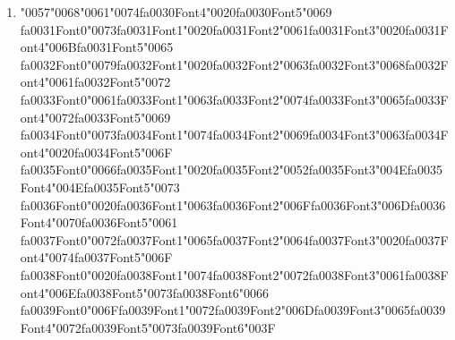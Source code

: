 \documentclass[12pt]{article}
\begin{document}
\begin{enumerate}[label=Q\arabic*.]
\begin{enumerate}[label=(\Alph*)]
    \item Ignore context entirely
    \item Only use previous tokens
\end{enumerate}
\item {\char"0057}{\char"0068}{\char"0061}{\char"0074}{\csname fa0030Font4\endcsname\char"0020}{\csname fa0030Font5\endcsname\char"0069} {\csname fa0031Font0\endcsname\char"0073}{\csname fa0031Font1\endcsname\char"0020}{\csname fa0031Font2\endcsname\char"0061}{\csname fa0031Font3\endcsname\char"0020}{\csname fa0031Font4\endcsname\char"006B}{\csname fa0031Font5\endcsname\char"0065} {\csname fa0032Font0\endcsname\char"0079}{\csname fa0032Font1\endcsname\char"0020}{\csname fa0032Font2\endcsname\char"0063}{\csname fa0032Font3\endcsname\char"0068}{\csname fa0032Font4\endcsname\char"0061}{\csname fa0032Font5\endcsname\char"0072} {\csname fa0033Font0\endcsname\char"0061}{\csname fa0033Font1\endcsname\char"0063}{\csname fa0033Font2\endcsname\char"0074}{\csname fa0033Font3\endcsname\char"0065}{\csname fa0033Font4\endcsname\char"0072}{\csname fa0033Font5\endcsname\char"0069} {\csname fa0034Font0\endcsname\char"0073}{\csname fa0034Font1\endcsname\char"0074}{\csname fa0034Font2\endcsname\char"0069}{\csname fa0034Font3\endcsname\char"0063}{\csname fa0034Font4\endcsname\char"0020}{\csname fa0034Font5\endcsname\char"006F} {\csname fa0035Font0\endcsname\char"0066}{\csname fa0035Font1\endcsname\char"0020}{\csname fa0035Font2\endcsname\char"0052}{\csname fa0035Font3\endcsname\char"004E}{\csname fa0035Font4\endcsname\char"004E}{\csname fa0035Font5\endcsname\char"0073} {\csname fa0036Font0\endcsname\char"0020}{\csname fa0036Font1\endcsname\char"0063}{\csname fa0036Font2\endcsname\char"006F}{\csname fa0036Font3\endcsname\char"006D}{\csname fa0036Font4\endcsname\char"0070}{\csname fa0036Font5\endcsname\char"0061} {\csname fa0037Font0\endcsname\char"0072}{\csname fa0037Font1\endcsname\char"0065}{\csname fa0037Font2\endcsname\char"0064}{\csname fa0037Font3\endcsname\char"0020}{\csname fa0037Font4\endcsname\char"0074}{\csname fa0037Font5\endcsname\char"006F} {\csname fa0038Font0\endcsname\char"0020}{\csname fa0038Font1\endcsname\char"0074}{\csname fa0038Font2\endcsname\char"0072}{\csname fa0038Font3\endcsname\char"0061}{\csname fa0038Font4\endcsname\char"006E}{\csname fa0038Font5\endcsname\char"0073}{\csname fa0038Font6\endcsname\char"0066} {\csname fa0039Font0\endcsname\char"006F}{\csname fa0039Font1\endcsname\char"0072}{\csname fa0039Font2\endcsname\char"006D}{\csname fa0039Font3\endcsname\char"0065}{\csname fa0039Font4\endcsname\char"0072}{\csname fa0039Font5\endcsname\char"0073}{\csname fa0039Font6\endcsname\char"003F}

\end{enumerate}
\end{document}
